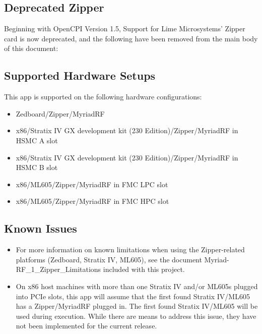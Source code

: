 \begin{appendices}
\pagebreak
\section{Deprecated Zipper}
\label{app:Zipper}
Beginning with OpenCPI Version 1.5, Support for Lime Microsystems' Zipper card is now deprecated, and the following have been removed from the main body of this document:\medskip

\subsection{Supported Hardware Setups}
This app is supported on the following hardware configurations:
\begin{itemize}
  \item Zedboard/Zipper/MyriadRF
  \item x86/Stratix IV GX development kit (230 Edition)/Zipper/MyriadRF in HSMC A slot
  \item x86/Stratix IV GX development kit (230 Edition)/Zipper/MyriadRF in HSMC B slot
  \item x86/ML605/Zipper/MyriadRF in FMC LPC slot
  \item x86/ML605/Zipper/MyriadRF in FMC HPC slot
\end{itemize}

\subsection{Known Issues}
\begin{itemize}
  \item For more information on known limitations when using the Zipper-related platforms (Zedboard, Stratix IV, ML605), see the document Myriad-RF\_1\_Zipper\_Limitations included with this project.
  \item  On x86 host machines with more than one Stratix IV and/or ML605s plugged into PCIe slots, this app will assume that the first found Stratix IV/ML605 has a Zipper/MyriadRF plugged in. The first found Stratix IV/ML605 will be used during execution. While there are means to address this issue, they have not been implemented for the current release.
\end{itemize}


\end{appendices}
